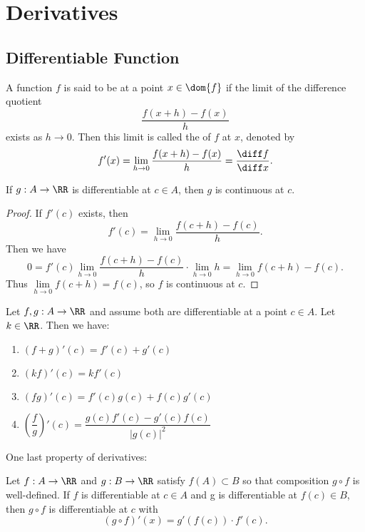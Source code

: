 \chapter{Derivatives}

\section{Differentiable Function}
\begin{definition}
A function $f$ is said to be  at a point $x \in \dom{f}$ if the limit of the difference quotient 
\[ \dfrac{f(x+h) - f(x)}{h} \] exists as $h\to 0$. Then this limit is called the  of $f$ at $x$, denoted by 
\[ f'(x) = \lim_{h\to 0} \dfrac{f(x+h) - f(x)}{h} = \dfrac{\diff f}{\diff x}. \]
\end{definition}

\begin{theorem}
If $g: A\to\RR$ is differentiable at $c \in A$, then $g$ is continuous at $c$. 
\end{theorem}
\begin{proof}
If $f'(c)$ exists, then 
\[ f'(c) = \lim_{h\to 0} \dfrac{f(c+h) - f(c)}{h}. \]
Then we have 
\[ 0 = f'(c)\lim_{h\to 0} \dfrac{f(c+h) - f(c)}{h} \cdot \lim_{h\to 0} h = \lim_{h\to 0} f(c+h) - f(c). \]
Thus $\lim\limits_{h\to 0} f(c+h) = f(c)$, so $f$ is continuous at $c$.
\end{proof}

\begin{theorem}
Let $f,g : A \to \RR$ and assume both are differentiable at a point $c \in A$. Let $k \in \RR$. Then we have:
\begin{enumerate}
\item $(f+g)'(c) = f'(c) + g'(c)$
\item $(kf)'(c) = kf'(c)$
\item $(fg)'(c) = f'(c)g(c) + f(c)g'(c)$
\item $\left ( \dfrac{f}{g} \right )' (c) = \dfrac{g(c)f'(c) - g'(c)f(c)}{|g(c)|^2}$ 
\end{enumerate}
\end{theorem}

One last property of derivatives: 
\begin{theorem}
Let $f: A \to \RR$ and $g: B \to \RR$ satisfy $f(A) \subset B$ so that composition $g \circ f$ is well-defined. If $f$ is differentiable at $c \in A$ and g is differentiable at $f(c) \in B$, then $g \circ f$ is differentiable at $c$ with 
\[ (g\circ f)'(x) = g'(f(c))\cdot f'(c). \]
\end{theorem}


